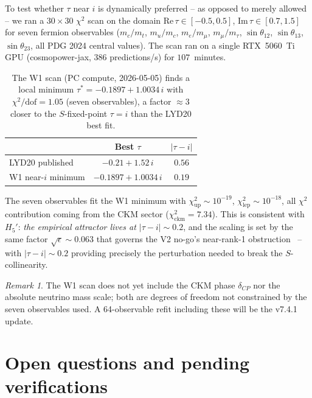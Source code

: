 \documentclass[a4paper,11pt]{article}
\theoremstyle{definition}
\theoremstyle{remark}
\newtheorem{remark}[theorem]{Remark}
\begin{document}
To test whether $\tau$ near $i$ is dynamically preferred -- as opposed
to merely allowed -- we ran a $30\times 30$ $\chi^{2}$ scan on the
domain $\mathrm{Re}\,\tau\in[-0.5,0.5]$,
$\mathrm{Im}\,\tau\in[0.7,1.5]$ for seven fermion observables
($m_c/m_t$, $m_u/m_c$, $m_e/m_\mu$, $m_\mu/m_\tau$,
$\sin\theta_{12}$, $\sin\theta_{13}$, $\sin\theta_{23}$, all PDG
2024 central values).  The scan ran on a single RTX~5060~Ti GPU
(cosmopower-jax, 386 predictions/s) for $107$~minutes.

\begin{table}[ht]
\centering
\begin{tabular}{lcc}
\toprule
& Best $\tau$ & $|\tau-i|$ \\
\midrule
LYD20 published~\cite{LYD20} & $-0.21+1.52\,i$ & $0.56$ \\
W1 near-$i$ minimum & $-0.1897+1.0034\,i$ & $\bm{0.19}$ \\
\bottomrule
\end{tabular}
\caption{The W1 scan (PC compute, 2026-05-05) finds a local minimum
$\tau^{*}=-0.1897+1.0034\,i$ with $\chi^{2}/\mathrm{dof}=1.05$
(seven observables), a factor $\approx 3$ closer to the
$S$-fixed-point $\tau=i$ than the LYD20 best fit.}
\label{tab:W1}
\end{table}

The seven observables fit the W1 minimum with $\chi^{2}_{\mathrm{up}}
\sim 10^{-19}$, $\chi^{2}_{\mathrm{lep}}\sim 10^{-18}$, all $\chi^{2}$
contribution coming from the CKM sector ($\chi^{2}_{\mathrm{ckm}} =
7.34$).  This is consistent with $H_5'$:
\emph{the empirical attractor lives at $|\tau-i|\sim 0.2$}, and the
scaling is set by the same factor $\sqrt{\epsilon}\sim 0.063$ that
governs the V2 no-go's near-rank-1 obstruction~\cite{V2NoGo} -- with
$|\tau-i|\sim 0.2$ providing precisely the perturbation needed to
break the $S$-collinearity.

\begin{remark}
The W1 scan does not yet include the CKM phase $\delta_{CP}$ nor the
absolute neutrino mass scale; both are degrees of freedom not
constrained by the seven observables used.  A 64-observable refit
including these will be the v7.4.1 update.
\end{remark}

\section{Open questions and pending verifications}
\label{sec:open}
\end{document}
